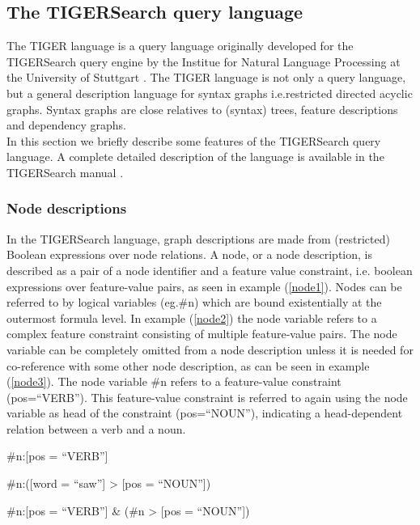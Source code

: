 \documentclass[]{scrartcl}
\theoremstyle{exmp}
\begin{document}
\subsection{The TIGERSearch query language}\label{TIGER}
The TIGER language is a query language originally developed for the TIGERSearch query engine  by the Institue for Natural Language Processing at the University of Stuttgart \cite{IMS}. The TIGER language is not only a query language, but a general description language for syntax graphs i.e.restricted directed acyclic graphs. Syntax graphs are close relatives to (syntax) trees, feature descriptions and dependency graphs. \\
In this section we briefly describe some features of the TIGERSearch query language. A complete detailed description of the language is available in the TIGERSearch manual \cite{TIGERmanual}. \\
\subsubsection{Node descriptions}
In the TIGERSearch language, graph descriptions are made from (restricted) Boolean expressions over node relations. A node, or a node description, is described as a pair of a node identifier and a feature value constraint, i.e. boolean expressions over feature-value pairs, as seen in example (\ref{node1}). Nodes can be referred to by logical variables (eg.\#n) which are bound existentially at the outermost formula level. In example (\ref{node2}) the node variable refers to a complex feature constraint consisting of multiple feature-value pairs. The node variable can be completely omitted from a node description unless it is needed for co-reference with some other node description, as can be seen in example (\ref{node3}). The node variable \#n refers to a feature-value constraint (pos=``VERB''). This feature-value constraint is referred to again using the node variable as head of the constraint (pos=``NOUN''), indicating a head-dependent relation between a verb and a noun. 

\begin{exe}
	\ex \label{node1}
	\#n:[pos = ``VERB''] 
\end{exe}
\begin{exe}
	\ex \label{node2}
	\#n:([word = ``saw''] > [pos = ``NOUN''])
\end{exe}
\begin{exe}
	\ex \label{node3}
	\#n:[pos = ``VERB''] \& (\#n > [pos = ``NOUN''])
\end{exe}
\vspace{0.2cm}
\end{document}
